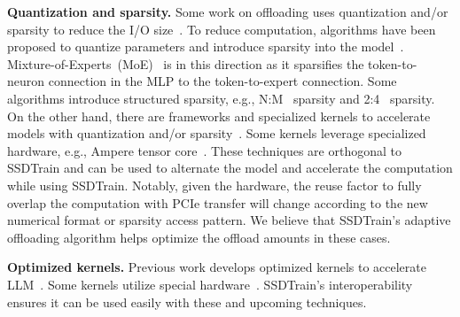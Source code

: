  
\noindent
\textbf{Quantization and sparsity.} Some work on offloading uses quantization and/or sparsity to reduce the I/O size~\cite{shengFlexGenHighThroughputGenerative2023,alizadehLLMFlashEfficient2024,baeFlashNeuronSSDEnabledLargeBatch2021}.  To reduce computation, algorithms have been proposed to quantize parameters and introduce sparsity into the model~\cite{zaheerBigBirdTransformers2020,liuDejaVuContextual2023,kimSqueezeLLMDenseandSparseQuantization2024,dettmersSpQRSparseQuantizedRepresentation2023,frantarSparseGPTMassiveLanguage2023}. Mixture-of-Experts~(MoE)~\cite{shazeerOutrageouslyLargeNeural2017a} is in this direction as it sparsifies the token-to-neuron connection in the MLP to the token-to-expert connection. Some algorithms introduce structured sparsity, e.g., N:M~\cite{zhouLearningFinegrainedStructured2021} sparsity and 2:4~\cite{poolChannelPermutationsSparsity2021} sparsity. On the other hand, there are frameworks and specialized kernels to accelerate models with quantization and/or sparsity~\cite{galeMegaBlocksEfficientSparse2023,zhengSparTADeepLearningModel2022,galeSparseGPUKernels2020,shigangliEfficientQuantizedSparse2024}. Some kernels leverage specialized hardware, e.g., Ampere tensor core~\cite{chenDynamicFineGrainedStructured2023,mishraAcceleratingSparseDeep2021}.
These techniques are orthogonal to SSDTrain and can be used to alternate the model and accelerate the computation while using SSDTrain. Notably, given the hardware, the reuse factor to fully overlap the computation with PCIe transfer will change according to the new numerical format or sparsity access pattern. We believe that SSDTrain's adaptive offloading algorithm helps optimize the offload amounts in these cases.



\noindent
\textbf{Optimized kernels.} Previous work develops optimized kernels to accelerate LLM~\cite{daoFlashAttentionFastMemoryEfficient2022,daoFlashAttention2FasterAttention2023,nvidiaNVIDIATensorRTLLM2023}. Some kernels utilize special hardware~\cite{nvidiaNVIDIATransformerEngine2023}. SSDTrain's interoperability ensures it can be used easily with these and upcoming techniques.  

